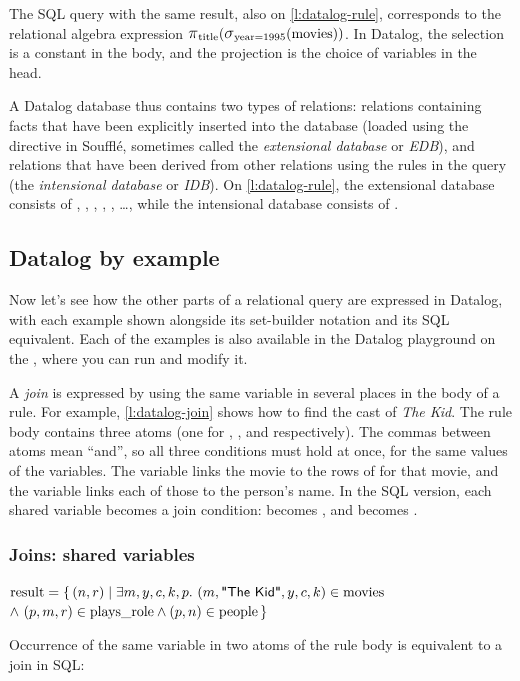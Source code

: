 The SQL query with the same result, also on \autoref{l:datalog-rule}, corresponds to the relational algebra expression $\raop{\pi}_{\ra{title}}(\raop{\sigma}_{\ra{year}=1995}(\ra{movies}))$.
In Datalog, the selection is a constant in the body, and the projection is the choice of variables in the head.

A Datalog database thus contains two types of relations: relations containing facts that have been explicitly inserted into the database (loaded using the  directive in Soufflé, sometimes called the \emph{extensional database} or \emph{EDB}), and relations that have been derived from other relations using the rules in the query (the \emph{intensional database} or \emph{IDB}).
On \autoref{l:datalog-rule}, the extensional database consists of , , , , , \dots, while the intensional database consists of .


\subsection{Datalog by example}\label{sec:datalog-examples}

Now let's see how the other parts of a relational query are expressed in Datalog, with each example shown alongside its set-builder notation and its SQL equivalent.
Each of the examples is also available in the Datalog playground on the \materialspage{}, where you can run and modify it.

A \emph{join} is expressed by using the same variable in several places in the body of a rule.
For example, \autoref{l:datalog-join} shows how to find the cast of \emph{The Kid}.
The rule body contains three atoms (one for , , and  respectively).
The commas between atoms mean ``and'', so all three conditions must hold at once, for the same values of the variables.
The variable  links the movie to the rows of  for that movie, and the variable  links each of those to the person's name.
In the SQL version, each shared variable becomes a join condition:  becomes , and  becomes .

\begin{frame}
    \label{s:datalog-join}
    \frametitle{Joins: shared variables}
    \vspace{0.3em}
    {\footnotesize
    $\mathrm{result} = \{\, (n, r) \mid \exists m, y, c, k, p.\ (m, \text{\textsf{"The Kid"}}, y, c, k) \in \mathrm{movies}$\\
    \hspace*{8.5em}$\wedge\ (p, m, r) \in \mathrm{plays\_role} \wedge (p, n) \in \mathrm{people} \,\}$}
    \par\vspace{0.3em}\pause
    Occurrence of the same variable in two atoms of the rule body is equivalent to a join in SQL:
    \inputminted[fontsize=\footnotesize]{sql}{code/datalog-join.sql}
\end{frame}
\label{l:datalog-join}

